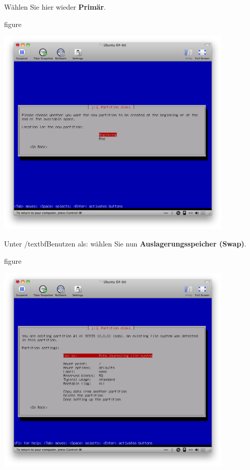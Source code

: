 Wählen Sie hier wieder \textbf{Primär}.

\begin{nofloat}{figure}
\begin{center}
\includegraphics[width=0.85\textwidth]{screenshots/17_ubuntu_install.png}
\end{center}
\end{nofloat}

\pagebreak
Unter /textbf{Benutzen als:} wählen Sie nun \textbf{Auslagerungsspeicher (Swap)}.

\begin{nofloat}{figure}
\begin{center}
\includegraphics[width=0.85\textwidth]{screenshots/18_ubuntu_install.png}
\end{center}
\end{nofloat}

